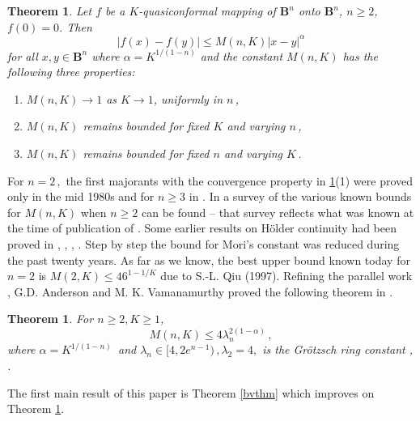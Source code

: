 \documentclass[12pt,a4paper,leqno]{amsart}
\theoremstyle{plain}
\newtheorem{theorem}[equation]{Theorem}
\numberwithin{equation}{section}          %
\begin{document}
\begin{theorem}\label{fvu}\cite[Theorem 1.3]{fv} Let $f$ be a $K$-quasiconformal mapping
of $\mathbf{B}^n$ onto $\mathbf{B}^n$, $n\geq 2$, $f(0)=0$. Then
\begin{equation}\label{fvu1}
|f(x)-f(y)| \le M(n,K)|x-y|^{\alpha}
\end{equation}
for all $x,y\in \mathbf{B}^n$ where $\alpha= K^{1/(1-n)}$ and the constant $M(n,K)$
has the following three properties:
\begin{enumerate}
\item $M(n,K)\to 1$ as $K\to 1$, uniformly in $n$\,,
\item $M(n,K)$ remains bounded for fixed $K$ and varying $n$\,,
\item $M(n,K)$ remains bounded for fixed $n$ and varying $K$\,.
\end{enumerate}
\end{theorem}

For $n=2\,,$ the first majorants with the convergence property in
\ref{fvu}(1) were proved only in the mid 1980s and for $n \geq 3$
in \cite{fv}. In \cite{fv} a survey of the various known bounds for
$M(n,K)$ when $n\ge 2$ can be found -- that survey reflects what was
known at the time of publication of \cite{fv}. Some earlier results
on H\"older continuity had been proved in
\cite{g},  \cite{mrv}, \cite{r}, \cite{s}. Step by step the
bound for Mori's constant was reduced during the past twenty years.
As far as we know, the best upper bound known today for $n=2$ is
$M(2,K)\le 46^{1-1/K} $ due to S.-L. Qiu \cite{q} (1997). Refining
the parallel work \cite{fv}, G.D. Anderson and M. K. Vamanamurthy
proved the following theorem in \cite{av}.


\begin{theorem} \label{anva} For $n\geq 2,K\geq 1$,
$$M(n,K) \leq 4\lambda_n^{2(1-\alpha)} \,,   $$
where $\alpha=K^{1/(1-n)}\,$ and $ \lambda_n\in [4, 2e^{n-1}) \,,
\lambda_2=4,$ is the Gr\"otzsch ring constant \cite{an},
\cite[p.89]{vuobook}.
\end{theorem}


The first main result of this paper is Theorem \ref{bvthm} which improves on
Theorem \ref{anva}.
\end{document}
